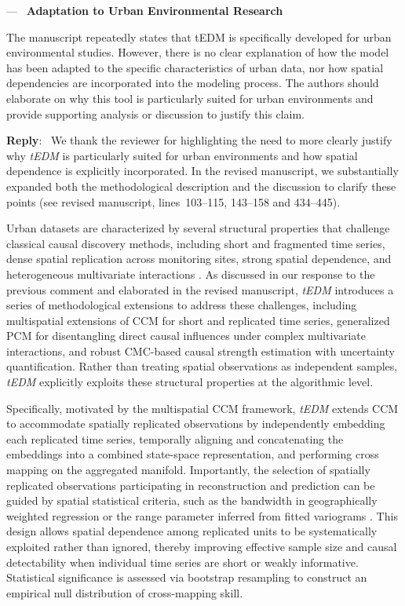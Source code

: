 \documentclass[11pt]{article}
\newcounter{reviewer}
\newcounter{point}[reviewer]
\renewcommand{\thepoint}{Comment\,\thereviewer.\arabic{point}}
\newenvironment{point}
   {\refstepcounter{point} \bigskip \noindent {\textbf{Reviewer~\thepoint} } ---\ }
   {\par }
\newenvironment{reply}
   {\medskip \noindent \color{blue} \begin{sf}\textbf{Reply}:\  }
   {\medskip \par \end{sf}}
\begin{document}
\begin{point}
\textbf{Adaptation to Urban Environmental Research}

The manuscript repeatedly states that tEDM is specifically developed for urban environmental studies. However, there is no clear explanation of how the model has been adapted to the specific characteristics of urban data, nor how spatial dependencies are incorporated into the modeling process. The authors should elaborate on why this tool is particularly suited for urban environments and provide supporting analysis or discussion to justify this claim.
\end{point}

\begin{reply} 
We thank the reviewer for highlighting the need to more clearly justify why \textit{tEDM} is particularly suited for urban environments and how spatial dependence is explicitly incorporated. In the revised manuscript, we substantially expanded both the methodological description and the discussion to clarify these points (see revised manuscript, lines~103--115, 143--158 and 434--445).

Urban datasets are characterized by several structural properties that challenge classical causal discovery methods, including short and fragmented time series, dense spatial replication across monitoring sites, strong spatial dependence, and heterogeneous multivariate interactions \citep{mcphearson2016understand_urban_systems,gan2025urban_transfer_entropy}. As discussed in our response to the previous comment and elaborated in the revised manuscript, \textit{tEDM} introduces a series of methodological extensions to address these challenges, including multispatial extensions of CCM for short and replicated time series, generalized PCM for disentangling direct causal influences under complex multivariate interactions, and robust CMC-based causal strength estimation with uncertainty quantification. Rather than treating spatial observations as independent samples, \textit{tEDM} explicitly exploits these structural properties at the algorithmic level.

Specifically, motivated by the multispatial CCM framework, \textit{tEDM} extends CCM to accommodate spatially replicated observations by independently embedding each replicated time series, temporally aligning and concatenating the embeddings into a combined state-space representation, and performing cross mapping on the aggregated manifold. Importantly, the selection of spatially replicated observations participating in reconstruction and prediction can be guided by spatial statistical criteria, such as the bandwidth in geographically weighted regression \citep{brunsdon1996gwr} or the range parameter inferred from fitted variograms \citep{webster2007gstat}. This design allows spatial dependence among replicated units to be systematically exploited rather than ignored, thereby improving effective sample size and causal detectability when individual time series are short or weakly informative. Statistical significance is assessed via bootstrap resampling to construct an empirical null distribution of cross-mapping skill.


\end{reply}
\end{document}
